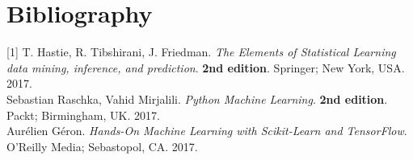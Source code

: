 \section{Bibliography}
\label{chap:Bibliography}

\label{Bib:TheElementsOfStatisticalLearningDataMining}[1] T. Hastie, R. Tibshirani, J. Friedman. \textit{The Elements of Statistical Learning data mining, inference, and prediction}. \textbf{2nd edition}. Springer; New York, USA. 2017.\\

\label{Bib:PythonMachineLearning}\noindent [2] Sebastian Raschka, Vahid Mirjalili. \textit{Python Machine Learning}. \textbf{2nd edition}. Packt; Birmingham, UK. 2017.\\

\label{Bib:PythonMachineLearning}\noindent [3] Aurélien Géron. \textit{Hands-On Machine Learning with Scikit-Learn and TensorFlow}. O'Reilly Media; Sebastopol, CA. 2017.\\
